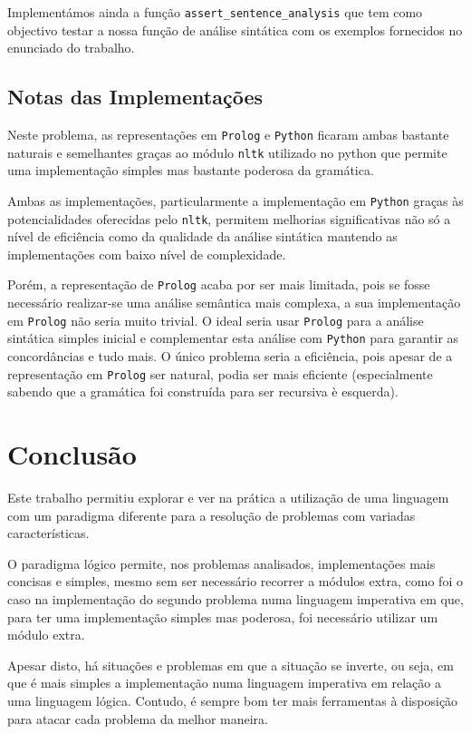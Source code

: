 \documentclass[12pt,a4paper,oneside]{article}
\begin{document}
Implementámos ainda a função \texttt{assert\_sentence\_analysis} que
tem como objectivo testar a nossa função de análise sintática com os
exemplos fornecidos no enunciado do trabalho.

\subsection{Notas das Implementações}

Neste problema, as representações em \texttt{Prolog} e \texttt{Python}
ficaram ambas bastante naturais e semelhantes graças ao módulo
\texttt{nltk} utilizado no python que permite uma implementação
simples mas bastante poderosa da gramática.

Ambas as implementações, particularmente a implementação em
\texttt{Python} graças às potencialidades oferecidas pelo
\texttt{nltk}, permitem melhorias significativas não só a nível de
eficiência como da qualidade da análise sintática mantendo as
implementações com baixo nível de complexidade.

Porém, a representação de \texttt{Prolog} acaba por ser mais limitada,
pois se fosse necessário realizar-se uma análise semântica mais
complexa, a sua implementação em \texttt{Prolog} não seria muito
trivial. O ideal seria usar \texttt{Prolog} para a análise sintática
simples inicial e complementar esta análise com \texttt{Python} para
garantir as concordâncias e tudo mais. O único problema seria a
eficiência, pois apesar de a representação em \texttt{Prolog} ser
natural, podia ser mais eficiente (especialmente sabendo que a
gramática foi construída para ser recursiva è esquerda).


\section{Conclusão}
\label{sec:conc}

Este trabalho permitiu explorar e ver na prática a utilização de uma
linguagem com um paradigma diferente para a resolução de problemas com
variadas características.

O paradigma lógico permite, nos problemas analisados, implementações
mais concisas e simples, mesmo sem ser necessário recorrer a módulos
extra, como foi o caso na implementação do segundo problema numa
linguagem imperativa em que, para ter uma implementação simples mas
poderosa, foi necessário utilizar um módulo extra.

Apesar disto, há situações e problemas em que a situação se inverte,
ou seja, em que é mais simples a implementação numa linguagem
imperativa em relação a uma linguagem lógica. Contudo, é sempre bom ter
mais ferramentas à disposição para atacar cada problema da melhor
maneira.




\end{document}
